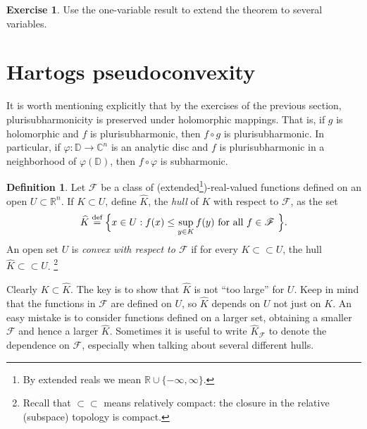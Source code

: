 \documentclass[12pt,openany]{book}
\newcommand{\C}{{\mathbb{C}}}
\newcommand{\R}{{\mathbb{R}}}
\newcommand{\D}{{\mathbb{D}}}
\newcommand{\sF}{{\mathscr{F}}}
\newcommand{\myindex}[1]{#1\index{#1}}
\theoremstyle{plain}
\theoremstyle{remark}
\theoremstyle{definition}
\newtheorem{defn}[thm]{Definition}
\newenvironment{exbox}{%
    \def\FrameCommand{\vrule width 1pt \relax\hspace{10pt}}%
    \MakeFramed{\advance\hsize-\width\FrameRestore}%
}{%
    \endMakeFramed
}
\theoremstyle{exercise}
\newtheorem{exercise}{Exercise}[section]
\theoremstyle{example}
\begin{document}
\begin{exbox}
\begin{exercise}
Use the one-variable result to extend the theorem to several variables.
\end{exercise}
\end{exbox}


\section{Hartogs pseudoconvexity}

It is worth mentioning explicitly that by the
exercises of the previous section,
plurisubharmonicity is preserved under holomorphic mappings.
That is, if $g$ is holomorphic and $f$ is plurisubharmonic, then
$f \circ g$ is plurisubharmonic.  In particular, if $\varphi \colon \D \to
\C^n$ is an analytic disc and $f$ is plurisubharmonic in a neighborhood of
$\varphi(\D)$,
then $f \circ \varphi$ is subharmonic.

\begin{defn}
Let $\sF$ be a class of (extended\footnote{%
By extended reals we mean $\R \cup \{ -\infty,\infty\}$.})-real-valued
functions defined on an open $U \subset \R^n$.  If $K
\subset U$, define $\widehat{K}$, the \emph{\myindex{hull}} of $K$ with
respect to $\sF$, as the set
%
\begin{equation*}
\widehat{K} \overset{\text{def}}{=} \Bigl\{ x \in U : f(x) \leq \sup_{y\in K} f(y)
\text{ for all $f \in \sF$ } \Bigr\} .
\end{equation*}
An open set $U$ is \emph{convex with respect to $\sF$}\index{convex!with respect to $\sF$}
if for every $K \subset \subset U$, the hull $\widehat{K} \subset \subset U$.%
\footnote{Recall that $\subset \subset$ means relatively compact:
the closure in the relative (subspace) topology is compact.}
\end{defn}

Clearly $K \subset \widehat{K}$.  The key is to show that $\widehat{K}$
is not ``too large'' for $U$.
Keep in mind that the functions in $\sF$ are defined on $U$, so $\widehat{K}$
depends on $U$ not just on $K$.  An easy mistake is to consider functions defined
on a larger set, obtaining a smaller $\sF$ and hence a larger
$\widehat{K}$.  Sometimes it is useful to write $\widehat{K}_{\sF}$ to
denote the dependence on $\sF$, especially when talking about several different
hulls.
\end{document}
